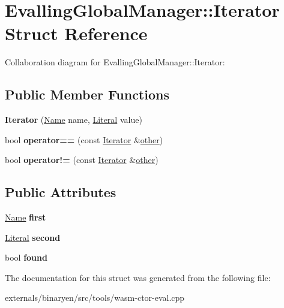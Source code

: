 \hypertarget{struct_evalling_global_manager_1_1_iterator}{}\section{Evalling\+Global\+Manager\+:\+:Iterator Struct Reference}
\label{struct_evalling_global_manager_1_1_iterator}


Collaboration diagram for Evalling\+Global\+Manager\+:\+:Iterator\+:
\subsection*{Public Member Functions}
\begin{DoxyCompactItemize}
\item 
\mbox{\label{struct_evalling_global_manager_1_1_iterator_a3564ac651ba760ad5e9df44375e47d7d}} 
{\bfseries Iterator} (\mbox{\hyperlink{structwasm_1_1_name}{Name}} name, \mbox{\hyperlink{classwasm_1_1_literal}{Literal}} value)
\item 
\mbox{\label{struct_evalling_global_manager_1_1_iterator_abd057392af7a2da18c03f98859f7b60e}} 
bool {\bfseries operator==} (const \mbox{\hyperlink{struct_evalling_global_manager_1_1_iterator}{Iterator}} \&\mbox{\hyperlink{structother}{other}})
\item 
\mbox{\label{struct_evalling_global_manager_1_1_iterator_a793ee7a7e6570db7e66953365479f844}} 
bool {\bfseries operator!=} (const \mbox{\hyperlink{struct_evalling_global_manager_1_1_iterator}{Iterator}} \&\mbox{\hyperlink{structother}{other}})
\end{DoxyCompactItemize}
\subsection*{Public Attributes}
\begin{DoxyCompactItemize}
\item 
\mbox{\label{struct_evalling_global_manager_1_1_iterator_a222686b512fb2676314fe4a7af1814ce}} 
\mbox{\hyperlink{structwasm_1_1_name}{Name}} {\bfseries first}
\item 
\mbox{\label{struct_evalling_global_manager_1_1_iterator_a78f0c41363facb789efd6e3451e6aaf6}} 
\mbox{\hyperlink{classwasm_1_1_literal}{Literal}} {\bfseries second}
\item 
\mbox{\label{struct_evalling_global_manager_1_1_iterator_a858447509d7aa4949fa735d09926e5cc}} 
bool {\bfseries found}
\end{DoxyCompactItemize}


The documentation for this struct was generated from the following file\+:\begin{DoxyCompactItemize}
\item 
externals/binaryen/src/tools/wasm-\/ctor-\/eval.\+cpp\end{DoxyCompactItemize}
